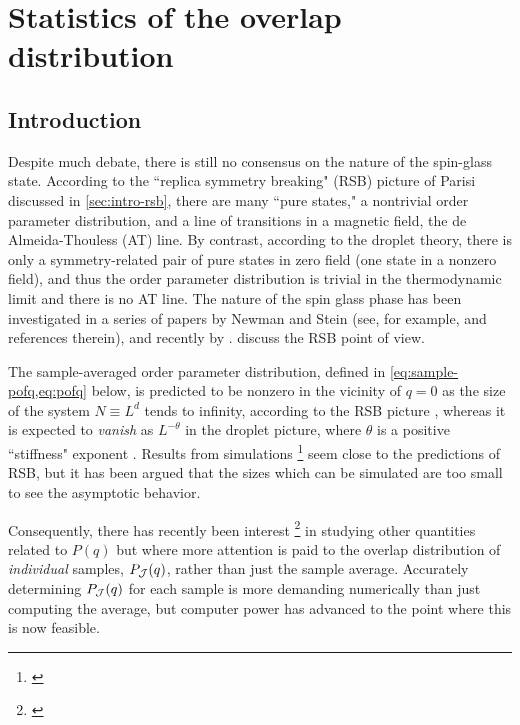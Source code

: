 \chapter{Statistics of the overlap distribution}
\label{chap:overlap}

\section{Introduction}

Despite much debate, there is still no consensus on the nature of the
spin-glass state. According to the ``replica symmetry breaking" (RSB) picture
of Parisi discussed in \cref{sec:intro-rsb}, there are many ``pure states," a
nontrivial order parameter distribution, and a line of transitions in a
magnetic field, the de Almeida-Thouless (AT) line. By contrast, according to
the droplet theory, there is only a symmetry-related pair of pure states in
zero field (one state in a nonzero field), and thus the order parameter
distribution is trivial in the thermodynamic limit and there is no AT line. The
nature of the spin glass phase has been investigated in a series of papers by
Newman and Stein (see, for example, \textcite{stein2013spin} and references
therein), and recently by \textcite{read2014short}.
\textcite{marinari2000replica} discuss the RSB point of view.

The sample-averaged order parameter distribution, defined in
\cref{eq:sample-pofq,eq:pofq} below, is predicted to be nonzero in the vicinity
of $q=0$ as the size of the system $N \equiv L^d$ tends to infinity, according
to the RSB picture \autocite{parisi1983order}, whereas it is expected to
\emph{vanish} as $L^{-\theta}$ in the droplet picture, where $\theta$ is a
positive ``stiffness" exponent \autocite{fisher1986ordered}.
Results from simulations%
\footnote{%
  \textcite{%
    marinari2000replica,%
    reger1990monte,%
    katzgraber2001monte,%
    katzgraber2003monte%
  }
}
seem close to the predictions of RSB, but it has been argued
\autocite{moore1998evidence,middleton2013extracting} that the sizes which can
be simulated are too small to see the asymptotic behavior.

Consequently, there has recently been interest%
\footnote{%
  \textcite{%
    middleton2013extracting,%
    yucesoy2012evidence,%
    monthus2013typical%
  }
}
in studying other quantities related to $P(q)$ but where more attention is paid
to the overlap distribution of \emph{individual} samples, $P_{\mathcal{J}}(q)$,
rather than just the sample average. Accurately determining $P_{\mathcal{J}}(q)$ for
each sample is more demanding numerically than just computing the average,
but computer power has advanced to the point where this is now feasible.

